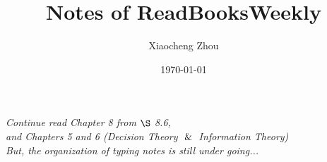 \documentclass[working]{article}
\title{Notes of ReadBooksWeekly}
\author{Xiaocheng Zhou}
\date{\today}
\begin{document}
\maketitle


% 


% 






% 


\setcounter{section}{2}
\setcounter{subsection}{4}
\begin{center}
\textit{
Continue read Chapter 8 from $\S$ 8.6, \\
and Chapters 5 and 6 (Decision Theory $\And$ Information Theory)\\
But, the organization of typing notes is still under going...}
\end{center}
\end{document}
